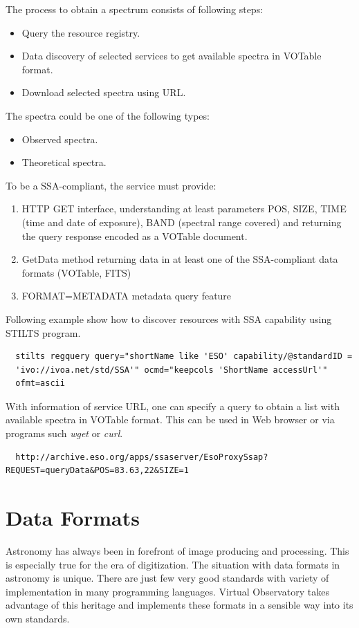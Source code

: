 \noindent The process to obtain a spectrum consists of following steps:

\begin{itemize}
\item Query the resource registry.
\item Data discovery of selected services to get available spectra in
  VOTable format.
\item Download selected spectra using URL.
\end{itemize}

\noindent The spectra could be one of the following types:

\begin{itemize}
\item Observed spectra.
\item Theoretical spectra.
\end{itemize}

\noindent To be a SSA-compliant, the service must provide:

\begin{enumerate}
\item HTTP GET interface, understanding at least parameters POS, SIZE,
  TIME (time and date of exposure), BAND (spectral range covered) and
  returning the query response encoded as a VOTable document.
\item GetData method returning data in at least one of the
  SSA-compliant data formats (VOTable, FITS)
\item FORMAT=METADATA metadata query feature
\end{enumerate}


Following example show how to discover resources with SSA capability
using STILTS program. 

\begin{lstlisting}
  stilts regquery query="shortName like 'ESO' capability/@standardID =
  'ivo://ivoa.net/std/SSA'" ocmd="keepcols 'ShortName accessUrl'"
  ofmt=ascii
\end{lstlisting}

With information of service URL, one can specify a query to obtain a
list with available spectra in VOTable format. This can be used in Web
browser or via programs such \emph{wget} or \emph{curl}.

\begin{lstlisting}
  http://archive.eso.org/apps/ssaserver/EsoProxySsap?REQUEST=queryData&POS=83.63,22&SIZE=1
\end{lstlisting}

\section{Data Formats}
Astronomy has always been in forefront of image producing and
processing. This is especially true for the era of digitization. The
situation with data formats in astronomy is unique. There are just few
very good standards with variety of implementation in many programming
languages. Virtual Observatory takes advantage of this heritage and
implements these formats in a sensible way into its own standards.
 

